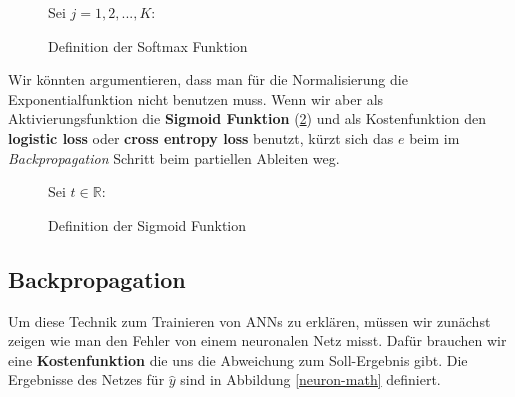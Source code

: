             \begin{figure}[H]
                \begin{mdframed}
                    Sei $j = 1,2,...,K$: \\
                    \hspace*{45mm} 
                \end{mdframed}
\formforfigure
                \caption{\label{softmax} Definition der Softmax Funktion \cite{softmax-lit}}
            \end{figure}

            \noindent
            Wir könnten argumentieren, dass man für die Normalisierung die Exponentialfunktion nicht benutzen muss. Wenn wir aber als Aktivierungsfunktion die \textbf{Sigmoid Funktion} (\ref{sigmoid}) und als Kostenfunktion den \textbf{logistic loss} oder \textbf{cross entropy loss} benutzt, kürzt sich das $e$ beim im \textit{Backpropagation} Schritt beim partiellen Ableiten weg.

            \begin{figure}[H]
                \begin{mdframed}
                    Sei $t \in \mathbb{R}$:\\
                    \hspace*{50mm} 
                \end{mdframed}
\formforfigure
                \caption{\label{sigmoid} Definition der Sigmoid Funktion}
            \end{figure}


            \subsection{Backpropagation} \label{backprop-chapter}
                Um diese Technik zum Trainieren von ANNs zu erklären, müssen wir zunächst zeigen wie man den Fehler von einem neuronalen Netz misst. Dafür brauchen wir eine \textbf{Kostenfunktion} die uns die Abweichung zum Soll-Ergebnis gibt. Die Ergebnisse des Netzes für $\widehat{y}$ sind in Abbildung \ref{neuron-math} definiert.

